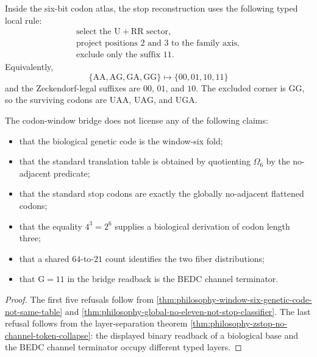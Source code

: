 \begin{definition}
\label{def:philosophy-local-suffix-rule-inside-six-bit-atlas}
Inside the six-bit codon atlas, the stop reconstruction uses the
following typed local rule:
$$
\begin{gathered}
  \text{select the }\mathrm{U}+\mathrm{RR}\text{ sector},\\
  \text{project positions }2\text{ and }3\text{ to the family axis},\\
  \text{exclude only the suffix }11.
\end{gathered}
$$
Equivalently,
$$
  \{\mathrm{AA},\mathrm{AG},\mathrm{GA},\mathrm{GG}\}
  \longmapsto
  \{00,01,10,11\}
$$
and the Zeckendorf-legal suffixes are $00$, $01$, and $10$. The
excluded corner is $\mathrm{GG}$, so the surviving codons are
$\mathrm{UAA}$, $\mathrm{UAG}$, and $\mathrm{UGA}$.
\end{definition}

\begin{theorem}
\label{thm:philosophy-codon-window-cannot-claim-boundary}
The codon-window bridge does not license any of the following claims:
\begin{itemize}
  \item that the biological genetic code is the window-six fold;
  \item that the standard translation table is obtained by quotienting
    $\Omega_{6}$ by the no-adjacent predicate;
  \item that the standard stop codons are exactly the globally
    no-adjacent flattened codons;
  \item that the equality $4^{3}=2^{6}$ supplies a biological
    derivation of codon length three;
  \item that a shared $64$-to-$21$ count identifies the two fiber
    distributions;
  \item that $\mathrm{G}=11$ in the bridge readback is the BEDC channel
    terminator.
\end{itemize}
\end{theorem}
\begin{proof}
The first five refusals follow from
\autoref{thm:philosophy-window-six-genetic-code-not-same-table} and
\autoref{thm:philosophy-global-no-eleven-not-stop-classifier}. The last
refusal follows from the layer-separation theorem
\autoref{thm:philosophy-zstop-no-channel-token-collapse}: the displayed
binary readback of a biological base and the BEDC channel terminator
occupy different typed layers.
\end{proof}

